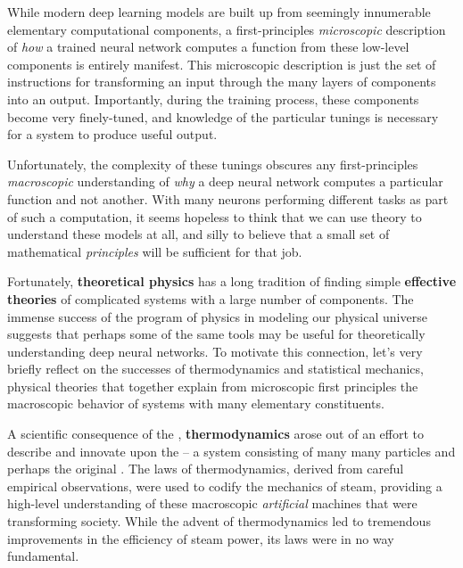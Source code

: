 \noindent{}While modern deep learning models are built up from seemingly innumerable elementary computational components, a first-principles \emph{microscopic} description of \emph{how} a trained neural network computes a function from these low-level components is entirely manifest.
This microscopic description is just the set of instructions for transforming an input through the many layers of  components into an output. Importantly, during the training process, these components become very finely-tuned, and knowledge of the particular tunings is necessary for a system to produce useful output.

Unfortunately, the complexity of these tunings obscures any first-principles \emph{macroscopic} understanding of \emph{why} a deep neural network computes a particular function and not another.
With many
neurons performing different tasks as part of such a computation, it seems hopeless 
to think that we can use theory to understand these models at all, and 
silly to believe that
a small set of 
mathematical \emph{principles}
will be sufficient for that job.

Fortunately, \textbf{theoretical physics} has a long tradition of finding simple \textbf{effective theories} 
of complicated systems with a large number of components. 
The immense success of the program of physics in modeling our physical universe 
suggests that perhaps some of the same tools may be useful for theoretically understanding deep neural networks.
To motivate this connection, let's very briefly reflect on the successes of thermodynamics and statistical mechanics, physical theories that
together explain from microscopic first principles the macroscopic behavior of systems with many elementary constituents.













A scientific consequence of the 
, %
\textbf{thermodynamics} arose out of an effort to describe and innovate upon the  -- a system consisting of many many particles and perhaps the original . The laws of thermodynamics, derived from careful empirical observations, were used to codify the mechanics of steam, providing a high-level understanding of these macroscopic \emph{artificial} machines that were transforming society. While the advent of thermodynamics led to tremendous improvements in the efficiency of steam power, its laws were in no way
fundamental.

